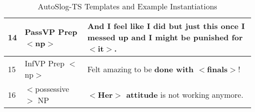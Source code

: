 \documentclass[11pt,letterpaper]{article}
\begin{document}
\begin{table}[t!bh]
\begin{small}
\begin{tabular}{@{}p{0.1in}|p{1.1in}|p{1.4in}@{}}
14&    PassVP Prep $<$np$>$ & And I feel like I did but just this once I messed up and I might {\bf be punished for $<$it$>$}. \\  \midrule
15&    InfVP Prep $<$np$>$ & Felt amazing to be {\bf done with $<$finals$>$}!\\ \midrule
16&    $<$possessive$>$ NP & {\bf $<$Her$>$ attitude} is not working anymore. \\ 
 \bottomrule
 \end{tabular}
\end{small}
\vspace{-.1in}
  \caption{\label{pattern-types} AutoSlog-TS Templates and Example Instantiations}
\vspace{-.1in}
\end{table}
\end{document}
